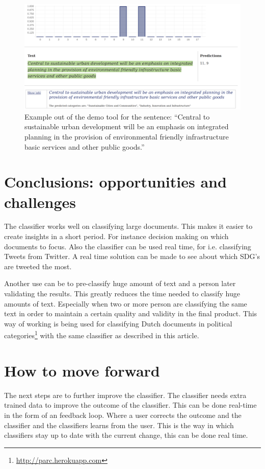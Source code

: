 \documentclass[]{article}
\begin{document}
\begin{figure}[!ht]\label{figure_example_out}
	\centering
	\includegraphics[width=1\textwidth]{example_output.png}
	\caption{Example out of the demo tool for the sentence: ``Central to sustainable urban development will be an emphasis on integrated planning in the provision of environmental friendly infrastructure basic services and other public goods.''}
\end{figure}

\section{Conclusions: opportunities and challenges}
The classifier works well on classifying large documents. This makes it easier to create insights in a short period. For instance decision making on which documents to focus. Also the classifier can be used real time, for i.e. classifying Tweets from Twitter. A real time solution can be made to see about which SDG's are tweeted the most. 

Another use can be to pre-classify huge amount of text and a person later validating the results. This greatly reduces the time needed to classify huge amounts of text. Especially when two or more person are classifying the same text in order to maintain a certain quality and validity in the final product. This way of working is being used for classifying Dutch documents in political categories\footnote{\url{http://parc.herokuapp.com}} with the same classifier as described in this article.  

\section{How to move forward}
The next steps are to further improve the classifier. The classifier needs extra trained data to improve the outcome of the classifier. This can be done real-time in the form of an feedback loop. Where a user corrects the outcome and the classifier and the classifiers learns from the user. This is the way in which classifiers stay up to date with the current change, this can be done real time.
\end{document}
